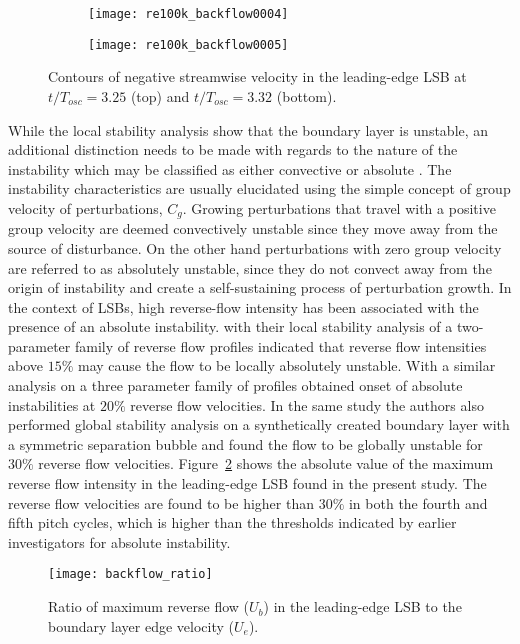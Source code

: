\begin{figure}
	\centering
	\begin{subfigure}[t]{1\textwidth}
		\centering
		\texttt{[image: re100k\_backflow0004]}
	\end{subfigure}
	\begin{subfigure}[t]{1\textwidth}
		\centering
		\texttt{[image: re100k\_backflow0005]}
	\end{subfigure}
	\caption{Contours of negative streamwise velocity in the leading-edge LSB at $t/T_{osc}=3.25$ (top) and $t/T_{osc}=3.32$ (bottom).}
	\label{fig:backflow_contours}
\end{figure}

While the local stability analysis show that the boundary layer is unstable, an additional distinction needs to be made with regards to the nature of the instability which may be classified as either convective or absolute \citep{briggs64}. The instability characteristics are usually elucidated using the simple concept of group velocity of perturbations, $C_{g}$. Growing perturbations that travel with a positive group velocity are deemed convectively unstable since they move away from the source of disturbance. On the other hand perturbations with zero group velocity are referred to as absolutely unstable, since they do not convect away from the origin of instability and create a self-sustaining process of perturbation growth. In the context of LSBs, high reverse-flow intensity has been associated with the presence of an absolute instability. \cite{alam00} with their local stability analysis of a two-parameter family of reverse flow profiles indicated that reverse flow intensities above $15\%$ may cause the flow to be locally absolutely unstable. With a similar analysis on a three parameter family of profiles \cite{hammond98} obtained onset of absolute instabilities at $20\%$ reverse flow velocities. In the same study the authors also performed global stability analysis on a synthetically created boundary layer with a symmetric separation bubble and found the flow to be globally unstable for $30\%$ reverse flow velocities. Figure~\ref{fig:backflow_ratio} shows the absolute value of the maximum reverse flow intensity in the leading-edge LSB found in the present study. The reverse flow velocities are found to be higher than $30\%$ in both the fourth and fifth pitch cycles, which is higher than the thresholds indicated by earlier investigators for absolute instability.
\begin{figure}
	\centering
	\texttt{[image: backflow\_ratio]}
	\caption{Ratio of maximum reverse flow ($U_{b}$) in the leading-edge LSB to the boundary layer edge velocity ($U_{e}$).} 
	\label{fig:backflow_ratio}
\end{figure}
